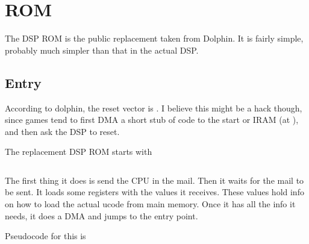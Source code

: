 \chapter{ROM}

The DSP ROM is the public replacement taken from Dolphin.
It is fairly simple, probably much simpler than that in the actual DSP.

\section{Entry}
According to dolphin, the reset vector is . I believe this might be a hack though, since games tend to first DMA a short stub of code to the start or IRAM (at ), and then ask the DSP to reset. 

The replacement DSP ROM starts with 

\inputminted[fontsize=\small]{asm}{../rom/rom_start.asm}

The first thing it does is send the CPU  in the mail. Then it waits for the mail to be sent. It loads some registers with the values it receives. These values hold info on how to load the actual ucode from main memory. Once it has all the info it needs, it does a DMA and jumps to the entry point.

Pseudocode for this is 
\inputminted[fontsize=\small]{asm}{../rom/rom_start.c}